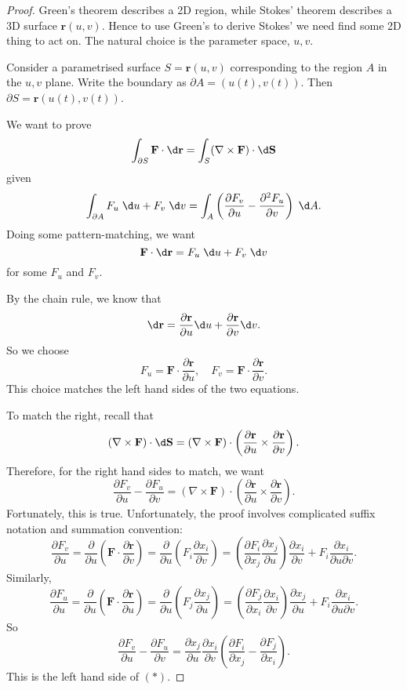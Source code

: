 \documentclass[a4paper]{article}
\begin{document}
\begin{proof}
  Green's theorem describes a 2D region, while Stokes' theorem describes a 3D surface $\mathbf{r}(u, v)$. Hence to use Green's to derive Stokes' we need find some 2D thing to act on. The natural choice is the parameter space, $u, v$.

  Consider a parametrised surface $S = \mathbf{r}(u, v)$ corresponding to the region $A$ in the $u, v$ plane. Write the boundary as $\partial A = (u(t), v(t))$. Then $\partial S = \mathbf{r}(u(t), v(t))$.

  We want to prove
  \[
    \int_{\partial S}\mathbf{F}\cdot \d \mathbf{r} = \int_S (\nabla \times \mathbf{F})\cdot \d \mathbf{S}
  \]
  given
  \[
    \int_{\partial A} F_u\;\d u + F_v\;\d v = \int_A\left(\frac{\partial F_v}{\partial u} - \frac{\partial^2 F_u}{\partial v}\right)\;\d A.
  \]
  Doing some pattern-matching, we want
  \[
    \mathbf{F}\cdot \d \mathbf{r} = F_u \;\d u + F_v \;\d v
  \]
  for some $F_u$ and $F_v$.

  By the chain rule, we know that
  \[
    \d \mathbf{r} = \frac{\partial \mathbf{r}}{\partial u} \d u + \frac{\partial \mathbf{r}}{\partial v}\d v.
  \]
  So we choose
  \[
    F_u = \mathbf{F}\cdot \frac{\partial \mathbf{r}}{\partial u}, \quad F_v = \mathbf{F}\cdot\frac{\partial \mathbf{r}}{\partial v}.
  \]
  This choice matches the left hand sides of the two equations.

  To match the right, recall that
  \[
    (\nabla\times \mathbf{F}) \cdot \d \mathbf{S} = (\nabla\times \mathbf{F})\cdot \left(\frac{\partial \mathbf{r}}{\partial u}\times \frac{\partial \mathbf{r}}{\partial v}\right).
  \]
  Therefore, for the right hand sides to match, we want
  \[
    \frac{\partial F_v}{\partial u} - \frac{\partial F_u}{\partial v} = (\nabla\times \mathbf{F})\cdot \left(\frac{\partial \mathbf{r}}{\partial u}\times \frac{\partial \mathbf{r}}{\partial v}\right).\tag{*}
  \]
  Fortunately, this is true. Unfortunately, the proof involves complicated suffix notation and summation convention:
  \[
    \frac{\partial F_v}{\partial u} = \frac{\partial}{\partial u}\left(\mathbf{F}\cdot \frac{\partial \mathbf{r}}{\partial v}\right) = \frac{\partial}{\partial u}\left(F_i\frac{\partial x_i}{\partial v}\right) = \left(\frac{\partial F_i}{\partial x_j}\frac{\partial x_j}{\partial u}\right)\frac{\partial x_i}{\partial v} + F_i\frac{\partial x_i}{\partial u\partial v}.
  \]
  Similarly,
  \[
    \frac{\partial F_u}{\partial u} = \frac{\partial}{\partial u}\left(\mathbf{F}\cdot \frac{\partial \mathbf{r}}{\partial u}\right) = \frac{\partial}{\partial u}\left(F_j\frac{\partial x_j}{\partial u}\right) = \left(\frac{\partial F_j}{\partial x_i}\frac{\partial x_i}{\partial v}\right)\frac{\partial x_j}{\partial u} + F_i\frac{\partial x_i}{\partial u\partial v}.
  \]
  So
  \[
    \frac{\partial F_v}{\partial u} - \frac{\partial F_u}{\partial v} = \frac{\partial x_j}{\partial u}\frac{\partial x_i}{\partial v}\left(\frac{\partial F_i}{\partial x_j} - \frac{\partial F_j}{\partial x_i}\right).
  \]
  This is the left hand side of $(*)$.


\end{proof}
\end{document}
